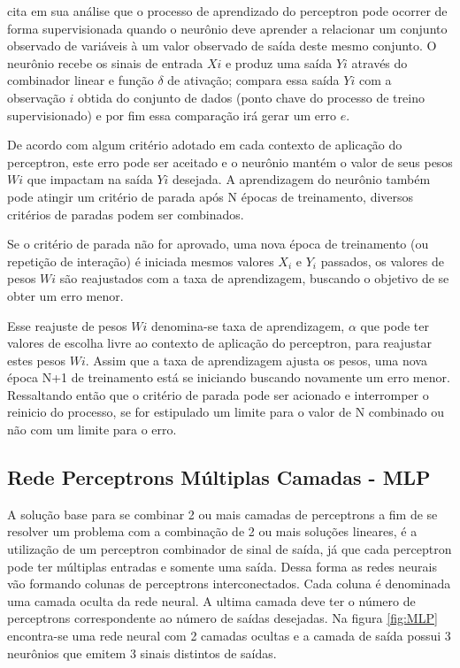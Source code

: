 \cite{Almeida2013} cita em sua análise que o processo de aprendizado do perceptron pode ocorrer de forma supervisionada quando o neurônio deve aprender a relacionar um conjunto observado de variáveis à um valor observado de saída deste mesmo conjunto. O neurônio recebe os sinais de entrada $Xi$ e produz uma saída $Yi$ através do combinador linear e função $\delta$ de ativação; compara essa saída $Yi$ com a observação $i$ obtida do conjunto de dados (ponto chave do processo de treino supervisionado) e por fim essa comparação irá gerar um erro $e$.
            
De acordo com algum critério adotado em cada contexto de aplicação do perceptron, este erro pode ser aceitado e o neurônio mantém o valor de seus pesos $Wi$ que impactam na saída $Yi$ desejada. A aprendizagem do neurônio também pode atingir um critério de parada após N épocas de treinamento, diversos critérios de paradas  podem ser combinados.  
            	
Se o critério de parada não for aprovado, uma nova época de treinamento (ou repetição de interação) é iniciada mesmos valores $X_i$ e $Y_i$ passados, os valores de pesos $Wi$ são reajustados com a taxa de aprendizagem, buscando o objetivo de se obter um erro menor.
            	
Esse reajuste de pesos $Wi$ denomina-se taxa de aprendizagem, $\alpha$ que pode ter valores de escolha livre ao contexto de aplicação do perceptron, para reajustar estes pesos $Wi$. Assim que a taxa de aprendizagem ajusta os pesos, uma nova época N+1 de treinamento está se iniciando buscando novamente um erro menor. Ressaltando então que o critério de parada pode ser acionado e interromper o reinicio do processo, se for estipulado um limite para o valor de N combinado ou não com um limite para o erro. 
            	
\subsection{Rede Perceptrons Múltiplas Camadas - MLP}
  	       
  	       A solução base para se combinar 2 ou mais camadas de perceptrons a fim de se resolver um problema com a combinação de 2 ou mais soluções lineares, é a utilização de um perceptron combinador de sinal de saída, já que cada perceptron pode ter múltiplas entradas e somente uma saída. Dessa forma as redes neurais vão formando colunas de perceptrons interconectados. Cada coluna é denominada uma camada oculta da rede neural. A ultima camada deve ter o número de perceptrons correspondente ao número de saídas desejadas. Na figura \ref{fig:MLP} encontra-se uma rede neural com 2 camadas ocultas e a camada de saída possui 3 neurônios que emitem 3 sinais distintos de saídas.
  	       

